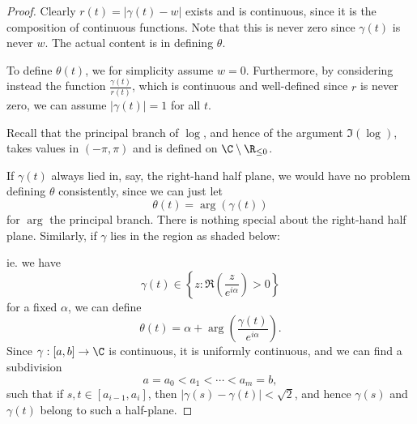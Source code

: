 \documentclass[a4paper]{article}
\begin{document}
\begin{proof}
  Clearly $r(t) = |\gamma(t) - w|$ exists and is continuous, since it is the composition of continuous functions. Note that this is never zero since $\gamma(t)$ is never $w$. The actual content is in defining $\theta$.

  To define $\theta(t)$, we for simplicity assume $w = 0$. Furthermore, by considering instead the function $\frac{\gamma(t)}{r(t)}$, which is continuous and well-defined since $r$ is never zero, we can assume $|\gamma(t)| = 1$ for all $t$.

  Recall that the principal branch of $\log$, and hence of the argument $\Im (\log)$, takes values in $(-\pi, \pi)$ and is defined on $\C \setminus \R_{\leq 0}$.
  \begin{center}
  \end{center}
  If $\gamma(t)$ always lied in, say, the right-hand half plane, we would have no problem defining $\theta$ consistently, since we can just let
  \[
    \theta(t) = \arg(\gamma(t))
  \]
  for $\arg$ the principal branch. There is nothing special about the right-hand half plane. Similarly, if $\gamma$ lies in the region as shaded below:
  \begin{center}
  \end{center}
  ie. we have
  \[
    \gamma(t) \in \left\{z : \Re\left(\frac{z}{e^{i\alpha}}\right) > 0\right\}
  \]
  for a fixed $\alpha$, we can define
  \[
    \theta(t) = \alpha + \arg\left(\frac{\gamma(t)}{e^{i\alpha}}\right).
  \]
  Since $\gamma: [a, b] \to \C$ is continuous, it is uniformly continuous, and we can find a subdivision
  \[
    a = a_0 < a_1 < \cdots < a_m = b,
  \]
  such that if $s, t \in [a_{i - 1}, a_i]$, then $|\gamma(s) - \gamma(t)| < \sqrt{2}$, and hence $\gamma(s)$ and $\gamma(t)$ belong to such a half-plane.


\end{proof}
\end{document}
